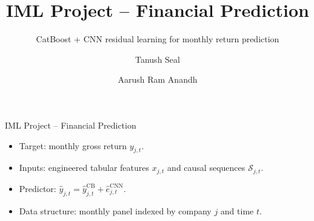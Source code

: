 \documentclass[aspectratio=169]{beamer}
\title{IML Project -- Financial Prediction}
\subtitle{CatBoost + CNN residual learning for monthly return prediction}
\author{Tanush Seal \and Aarush Ram Anandh}
\date{}
\newcommand{\seq}{\mathcal{S}}
\begin{document}
\begin{frame}
  \begin{center}
    \vspace{1.0cm}
    {\color{softpinkdark}\inserttitle\par}
    \vspace{0.3cm}
    {\color{softpinkdark}\insertsubtitle\par}
    \vspace{0.6cm}
    {\color{softpinkdark}\insertauthor\par}
  \end{center}
\end{frame}

\begin{frame}{IML Project -- Financial Prediction}
  \begin{itemize}
    \item Target: monthly gross return $y_{j,t}$.
    \item Inputs: engineered tabular features $x_{j,t}$ and causal sequences $\seq_{j,t}$.
    \item Predictor: $\hat y_{j,t} = \hat y^{\mathrm{CB}}_{j,t} + \hat e^{\mathrm{CNN}}_{j,t}$.
    \item Data structure: monthly panel indexed by company $j$ and time $t$.
  \end{itemize}
\end{frame}
\end{document}

